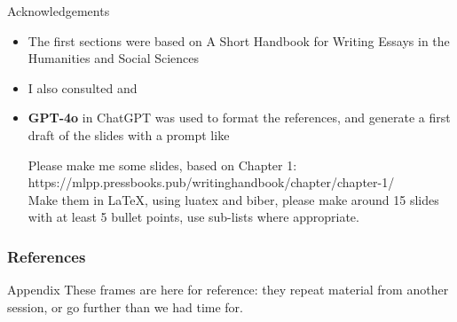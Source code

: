 \documentclass[aspectratio=169]{beamer}
\begin{document}


\begin{frame}[allowframebreaks]{Acknowledgements}

  \begin{itemize}
  \item The first sections were based on A Short Handbook for Writing Essays in the Humanities and Social Sciences \citep{writinghandbook}
  \item I also consulted \citet{Reid:2024} and \citet{Krause:2007}
  \item \textbf{GPT-4o} in ChatGPT \citep{openai-chatgpt-2025-03-14} was used to format the references, and generate a first draft of the slides with a prompt like
    \begin{flushleft}\ttfamily
       Please make me some slides, based on Chapter 1: https://mlpp.pressbooks.pub/writinghandbook/chapter/chapter-1/ \\

Make them in LaTeX, using luatex and biber, please make around 15 slides with at least 5 bullet points, use sub-lists where appropriate. \\
    \end{flushleft}
  \aicheck
  \end{itemize}

\end{frame}


\begin{frame}[allowframebreaks]
\frametitle{References}
\printbibliography[heading=none]
\end{frame}


\AtBeginSection[]{}
\appendix

\begin{frame}{Appendix}
These frames are here for reference: they repeat material from
another session, or go further than we had time for.
\end{frame}
\end{document}
